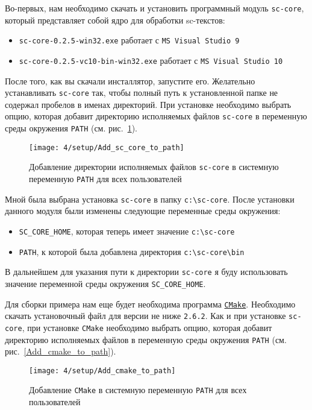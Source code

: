Во-первых, нам необходимо скачать и установить программный модуль
\texttt{sc-core}, который представляет собой ядро для обработки
sc-текстов:

\begin{itemize}
\item \verb|sc-core-0.2.5-win32.exe| работает с \texttt{MS Visual Studio 9}
\item \verb|sc-core-0.2.5-vc10-bin-win32.exe| работает с \texttt{MS Visual Studio 10}
\end{itemize}

После того, как вы скачали инсталлятор, запустите его. Желательно
устанавливать \texttt{sc-core} так, чтобы полный путь к установленной
папке не содержал пробелов в именах директорий. При установке
необходимо выбрать опцию, которая добавит директорию исполняемых
файлов \texttt{sc-core} в переменную среды окружения \verb|PATH|
(см. рис.~\ref{fig:Add_sc_core_to_path}).

\begin{figure}[h!]
  \centering
  \texttt{[image: 4/setup/Add\_sc\_core\_to\_path]}
  \caption{Добавление директории исполняемых файлов \texttt{sc-core} в
    системную переменную \texttt{PATH} для всех пользователей}
  \label{fig:Add_sc_core_to_path}
\end{figure}
 
Мной была выбрана установка \texttt{sc-core} в папку
\verb|c:\sc-core|. После установки данного модуля были изменены
следующие переменные среды окружения:

\begin{itemize}
\item \verb|SC_CORE_HOME|, которая теперь имеет значение
  \verb|c:\sc-core|
\item \verb|PATH|, к которой была добавлена директория
  \verb|c:\sc-core\bin|
\end{itemize}

В дальнейшем для указания пути к директории \texttt{sc-core} я буду
использовать значение переменной среды окружения \verb|SC_CORE_HOME|.

Для сборки примера нам еще будет необходима программа
\texttt{\href{http://www.cmake.org/}{CMake}}. Необходимо скачать
установочный файл для версии не ниже \texttt{2.6.2}. Как и при
установке \texttt{sc-core}, при установке \texttt{CMake} необходимо
выбрать опцию, которая добавит директорию исполняемых файлов в
переменную среды окружения \verb|PATH|
(см. рис.~\ref{Add_cmake_to_path}).
 
\begin{figure}[h]
  \centering
  \texttt{[image: 4/setup/Add\_cmake\_to\_path]}
  \caption{Добавление \texttt{CMake} в системную переменную
    \texttt{PATH} для всех пользователей}
  \label{fig:Add_cmake_to_path}
\end{figure}

